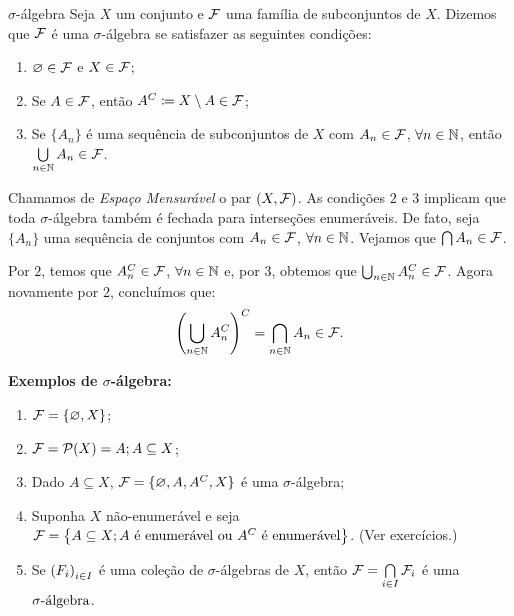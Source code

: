 \begin{definition*}{$\sigma$-álgebra}
Seja $X$ um conjunto e $\mcal F$ uma família de subconjuntos de $X$. Dizemos que $\mcal F$
é uma $\sigma$-álgebra se satisfazer as seguintes condições:
\begin{enumerate}
    \item $\emptyset \in \mcal F$ e $X \in \mcal F$;
    \item Se $A \in \mcal F$, então $A^C \coloneq X\setminus A \in \mcal F$;
    \item Se $\{A_n\}$ é uma sequência de subconjuntos de $X$ com $A_n \in \mcal F$, 
      $\forall n \in \mbb N$, então $\bigcup\limits_{n \in \mbb N} A_n \in \mcal F$.
\end{enumerate}
\end{definition*}
\vspace{5mm}

Chamamos de \textit{Espaço Mensurável} o par $(X,\mcal F)$. 
As condições $2$ e $3$ implicam que toda $\sigma$-álgebra também é fechada para interseções 
enumeráveis. De fato, seja $\{A_n\}$ uma sequência de conjuntos com $A_n \in \mcal F$, 
$\forall n \in \mbb N$. Vejamos que $\bigcap A_n \in \mcal F$.

Por $2$, temos que $A_n^C \in \mcal F$, $\forall n \in \mbb N$ e, por $3$, 
obtemos que $\bigcup_{n \in \mbb N} A_n^C \in \mcal F$. Agora novamente por $2$, 
concluímos que: 
\begin{align*}
  \left(\bigcup\limits_{n \in \mbb N} A_n^C\right)^C = \bigcap_{n \in \mbb N} A_n \in \mcal F.
\end{align*}

\noindent
\textbf{Exemplos de $\sigma$-álgebra:}
\begin{enumerate}
  \item $\mcal F= \{\emptyset, X\}$;
  \item $\mcal F = \mcal P(X) = {A; A\subseteq X}$;
  \item Dado $A \subseteq X$, $\mcal F = \{\emptyset, A, A^C, X\}$ é uma 
    $\sigma$-álgebra;
  \item Suponha $X$ não-enumerável e seja $\mcal F = \set{A \subseteq X; A \text{ é 
    enumerável ou } A^C \text{ é enumerável}}$. (Ver exercícios.)
  \item Se $\seqn F i I$ é uma coleção de $\sigma$-álgebras de $X$, então 
    $\mcal F = \mycap i I \mcal F_i$ é uma $\sigmaalg$.
\end{enumerate}


